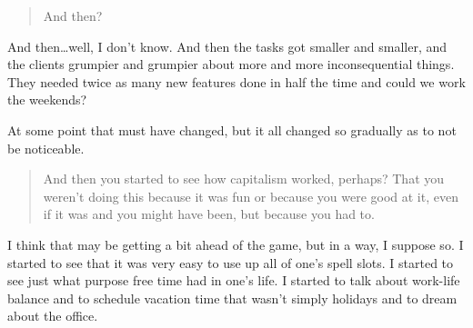 \begin{quote}
And then?
\end{quote}

And then\ldots{}well, I don't know. And then the tasks got smaller and smaller, and the clients grumpier and grumpier about more and more inconsequential things. They needed twice as many new features done in half the time and could we work the weekends?

At some point that must have changed, but it all changed so gradually as to not be noticeable.

\begin{quote}
And then you started to see how capitalism worked, perhaps? That you weren't doing this because it was fun or because you were good at it, even if it was and you might have been, but because you had to.
\end{quote}

I think that may be getting a bit ahead of the game, but in a way, I suppose so. I started to see that it was very easy to use up all of one's spell slots. I started to see just what purpose free time had in one's life. I started to talk about work-life balance and to schedule vacation time that wasn't simply holidays and to dream about the office.
